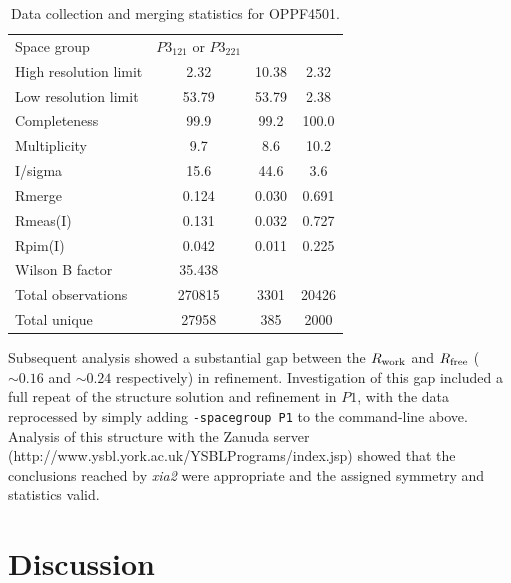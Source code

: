 \documentclass[preprint,pdf]{iucr}
\begin{document}
\begin{table}
\caption{Data collection and merging statistics for OPPF4501.
\label{table:oppf4501}}
\begin{tabular}{lccc}
Space group & $P3_121$ or $P3_221$ & & \\
High resolution limit                   &	  2.32	& 10.38	&  2.32\\
Low resolution limit                    &	 53.79	& 53.79	&  2.38\\
Completeness                            &	 99.9	& 99.2&	100.0\\
Multiplicity                            &	  9.7&	  8.6	& 10.2\\
I/sigma                                 &	 15.6&	 44.6	&  3.6\\
Rmerge                                  &	0.124&	0.030&	0.691\\
Rmeas(I)                                &	0.131&	0.032&	0.727\\
Rpim(I)                                 &	0.042&	0.011&	0.225\\
Wilson B factor                         &	35.438   & & \\
Total observations                      &	270815	&3301&	20426\\
Total unique                            &	27958&	385&	2000\\
\end{tabular}
\end{table}

Subsequent analysis showed a substantial gap between the
$R_{\rm{work}}$ and $R_{\rm{free}}$ ($\sim 0.16$ and $\sim 0.24$
respectively) in refinement. Investigation of this gap included a full repeat
of the structure solution and refinement in $P1$, with the data
reprocessed by simply adding \verb|-spacegroup P1| to the command-line
above. Analysis of this structure with the Zanuda server
(http://www.ysbl.york.ac.uk/YSBLPrograms/index.jsp)
showed that the conclusions reached
by \emph{xia2} were appropriate and the assigned symmetry and
statistics valid.

\section{Discussion}
\end{document}

